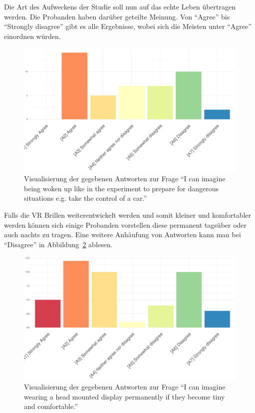 Die Art des Aufweckens der Studie soll nun auf das echte Leben übertragen werden. Die Probanden haben darüber geteilte Meinung. Von "`Agree"' bis "`Strongly disagree"' gibt es alle Ergebnisse, wobei sich die Meisten unter "`Agree"' einordnen würden.

\begin{figure}[H]
	\centering
	\includegraphics[width=\textwidth]{./_StudyResults/imagineWakingUp}
	\caption{Visualisierung der gegebenen Antworten zur Frage "`I can imagine being woken up like in the experiment to prepare for dangerous situations e.g. take the control of a car."'}
	\label{fig:imagineWakingUp}
\end{figure}

Falls die VR Brillen weiterentwickelt werden und somit kleiner und komfortabler werden können sich einige Probanden vorstellen diese permanent tagsüber oder auch nachts zu tragen. Eine weitere Anhäufung von Antworten kann man bei "`Disagree"' in Abbildung~\ref{fig:permanentWearing} ablesen. 

\begin{figure}[H]
	\centering
	\includegraphics[width=\textwidth]{./_StudyResults/permanentWearing}
	\caption{Visualisierung der gegebenen Antworten zur Frage "`I can imagine wearing a head mounted display permanently if they become tiny and comfortable."'}
	\label{fig:permanentWearing}
\end{figure}
